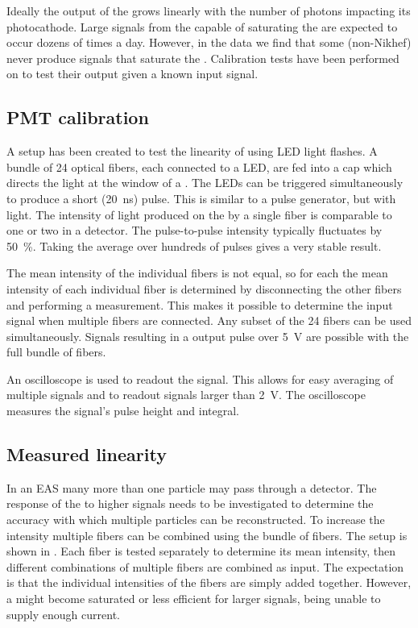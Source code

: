 Ideally the output of the \pmt grows linearly with the number of photons impacting its photocathode. Large signals from the \pmt capable of saturating the \adc are expected to occur dozens of times a day. However, in the data we find that some (non-Nikhef) \pmts never produce signals that saturate the \adc. Calibration tests have been performed on \pmts to test their output given a known input signal.


\subsection{PMT calibration}
\label{sub:pmt_calibration}

A setup has been created to test the linearity of \pmts using LED light flashes. A bundle of 24 optical fibers, each connected to a LED, are fed into a cap which directs the light at the window of a \pmt. The LEDs can be triggered simultaneously to produce a short (\SI{20}{\ns}) pulse. This is similar to a pulse generator, but with light. The intensity of light produced on the \pmt by a single fiber is comparable to one or two \mip in a detector. The pulse-to-pulse intensity typically fluctuates by \SI{50}{\percent}. Taking the average over hundreds of pulses gives a very stable result.

The mean intensity of the individual fibers is not equal, so for each \pmt the mean intensity of each individual fiber is determined by disconnecting the other fibers and performing a measurement. This makes it possible to determine the input signal when multiple fibers are connected. Any subset of the 24 fibers can be used simultaneously. Signals resulting in a \pmt output pulse over \SI{5}{\volt} are possible with the full bundle of fibers.

An oscilloscope is used to readout the \pmt signal. This allows for easy averaging of multiple signals and to readout signals larger than \SI{2}{\volt}. The oscilloscope measures the signal's pulse height and integral.


\subsection{Measured linearity}

In an EAS many more than one particle may pass through a detector. The response of the \pmt to higher signals needs to be investigated to determine the accuracy with which multiple particles can be reconstructed. To increase the intensity multiple fibers can be combined using the bundle of fibers. The setup is shown in . Each fiber is tested separately to determine its mean intensity, then different combinations of multiple fibers are combined as input. The expectation is that the individual intensities of the fibers are simply added together. However, a \pmt might become saturated or less efficient for larger signals, being unable to supply enough current.


